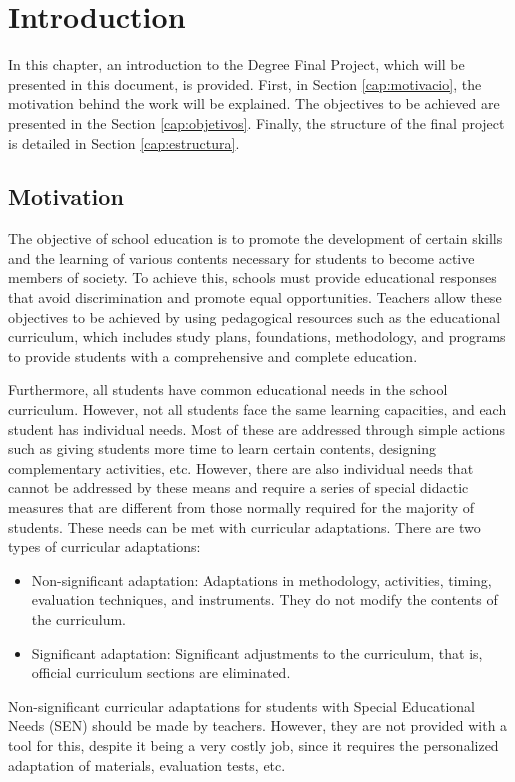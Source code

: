 \chapter{Introduction}
\label{cap:introduction}

In this chapter, an introduction to the Degree Final Project, which will be presented in this document, is provided. First, in Section \ref{cap:motivacio}, the motivation behind the work will be explained. The objectives to be achieved are presented in the Section \ref{cap:objetivos}. Finally, the structure of the final project is detailed in Section \ref{cap:estructura}.


\section{Motivation}\label{cap:motivation}
The objective of school education is to promote the development of certain skills and the learning of various contents necessary for students to become active members of society. To achieve this, schools must provide educational responses that avoid discrimination and promote equal opportunities. Teachers allow these objectives to be achieved by using pedagogical resources such as the educational curriculum, which includes study plans, foundations, methodology, and programs to provide students with a comprehensive and complete education.

Furthermore, all students have common educational needs in the school curriculum. However, not all students face the same learning capacities, and each student has individual needs. Most of these are addressed through simple actions such as giving students more time to learn certain contents, designing complementary activities, etc. However, there are also individual needs that cannot be addressed by these means and require a series of special didactic measures that are different from those normally required for the majority of students. These needs can be met with curricular adaptations. There are two types of curricular adaptations:
\begin{itemize}
\item Non-significant adaptation: Adaptations in methodology, activities, timing, evaluation techniques, and instruments. They do not modify the contents of the curriculum.
\item Significant adaptation: Significant adjustments to the curriculum, that is, official curriculum sections are eliminated.
\end{itemize}
Non-significant curricular adaptations for students with Special Educational Needs (SEN) should be made by teachers. However, they are not provided with a tool for this, despite it being a very costly job, since it requires the personalized adaptation of materials, evaluation tests, etc.

